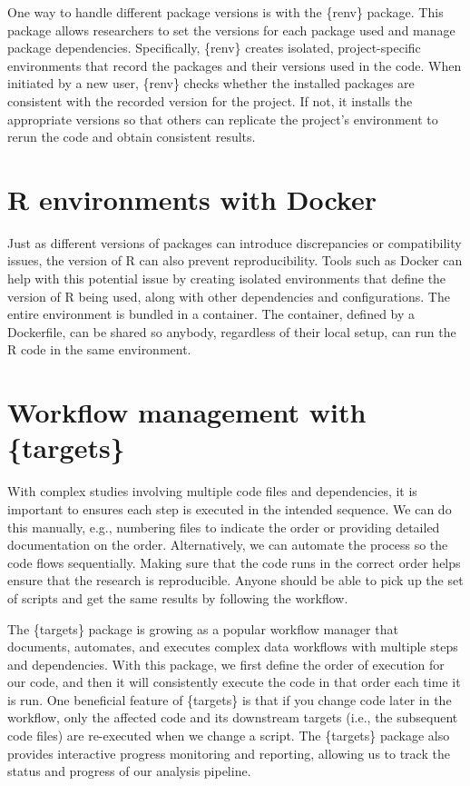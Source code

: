 \documentclass[
]{krantz}
\begin{document}
One way to handle different package versions is with the \{renv\} package. This package allows researchers to set the versions for each package used and manage package dependencies. Specifically, \{renv\} creates isolated, project-specific environments that record the packages and their versions used in the code. When initiated by a new user, \{renv\} checks whether the installed packages are consistent with the recorded version for the project. If not, it installs the appropriate versions so that others can replicate the project's environment to rerun the code and obtain consistent results.

\hypertarget{r-environments-with-docker}{%
\section{R environments with Docker}\label{r-environments-with-docker}}

Just as different versions of packages can introduce discrepancies or compatibility issues, the version of R can also prevent reproducibility. Tools such as Docker can help with this potential issue by creating isolated environments that define the version of R being used, along with other dependencies and configurations. The entire environment is bundled in a container. The container, defined by a Dockerfile, can be shared so anybody, regardless of their local setup, can run the R code in the same environment.

\hypertarget{workflow-management-with-targets}{%
\section{Workflow management with \{targets\}}\label{workflow-management-with-targets}}

With complex studies involving multiple code files and dependencies, it is important to ensures each step is executed in the intended sequence. We can do this manually, e.g., numbering files to indicate the order or providing detailed documentation on the order. Alternatively, we can automate the process so the code flows sequentially. Making sure that the code runs in the correct order helps ensure that the research is reproducible. Anyone should be able to pick up the set of scripts and get the same results by following the workflow.

The \{targets\} package is growing as a popular workflow manager that documents, automates, and executes complex data workflows with multiple steps and dependencies. With this package, we first define the order of execution for our code, and then it will consistently execute the code in that order each time it is run. One beneficial feature of \{targets\} is that if you change code later in the workflow, only the affected code and its downstream targets (i.e., the subsequent code files) are re-executed when we change a script. The \{targets\} package also provides interactive progress monitoring and reporting, allowing us to track the status and progress of our analysis pipeline.
\end{document}
